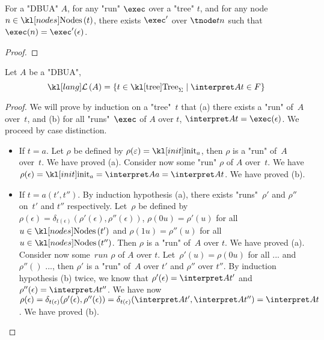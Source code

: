 \documentclass{article}
\begin{document}
\begin{lemma}\label{lem:exec-sub}
	For a "DBUA" $A$, for any "run" $\exec$ over a "tree" $t$, and for any node $n \in \nodes t$, there exists $\exec'$ over
	$\tnode t n$ such that $\exec (n) = \exec'(\epsilon)$.
\end{lemma}

\begin{proof}
	\todo{~}
\end{proof}

\begin{lemma}
	Let $A$ be a "DBUA",
	\[ \lang A = \setdef {t \in \tree_{\Sigma}} {\interpret A t \in F} \]
\end{lemma}

\begin{proof}
	We will prove by induction on a "tree"~$t$ that (a) there exists a "run" of~$A$ over~$t$, and (b) for all "runs"~$\exec$ of $A$ over $t$, $\interpret A t = \exec (\epsilon)$. 
	We proceed by case distinction.
	\begin{itemize}
		\item If $t = a$. Let $\rho$ be defined by $\rho(\varepsilon)=\init_a$, then $\rho$ is a "run" of~$A$ over~$t$. We have proved (a).
			Consider now some "run" $\rho$ of $A$ over~$t$. We have $\rho(\epsilon)=\init_a=\interpret A a=\interpret A t$. We have proved  (b).	
		\item If $t = a(t',t'')$. By induction hypothesis (a), there exists "runs"~$\rho'$ and $\rho''$ on~$t'$ and $t''$ respectively.
			Let~$\rho$ be defined by $\rho(\epsilon)=\delta_{t(\epsilon)}(\rho'(\epsilon),\rho''(\epsilon))$,
			$\rho(0u)=\rho'(u)$ for all $u\in\nodes{t'}$ and $\rho(1u)=\rho''(u)$ for all~$u\in \nodes{t''}$. Then $\rho$ is a "run" of~$A$ over $t$. We have proved (a).
			Consider now some~$run$ $\rho$ of $A$ over $t$. Let~$\rho'(u)=\rho(0u)$ for all ... and $\rho''()$ ...,
			then $\rho'$ is a "run" of~$A$ over $t'$ and $\rho''$ over $t''$. By induction hypothesis (b) twice, we know that $\rho'(\epsilon)=\interpret A {t'}$ and $\rho''(\epsilon)=\interpret A {t''}$.
			We have now $\rho(\epsilon) = \delta_{t(\epsilon)}(\rho'(\epsilon),\rho''(\epsilon)) = \delta_{t(\epsilon)}(\interpret A {t'},\interpret A {t''}) = \interpret A t$. We have proved (b).
	\end{itemize}
\end{proof}
\end{document}
